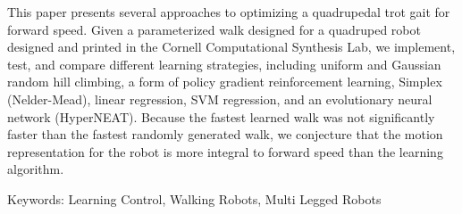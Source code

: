 This paper presents several approaches to optimizing a quadrupedal
trot gait for forward speed. Given a parameterized walk designed for
a quadruped robot designed and printed in the Cornell Computational
Synthesis Lab, we implement, test, and compare different learning strategies, 
including uniform and Gaussian random hill climbing, a form of policy 
gradient reinforcement learning\cite{1}, Simplex (Nelder-Mead), 
linear regression, SVM regression, and an evolutionary neural 
network (HyperNEAT)\cite{2}. Because the fastest learned walk was not
significantly faster than the fastest randomly generated walk, we
conjecture that the motion representation for the robot is more
integral to forward speed than the learning algorithm.


Keywords: Learning Control, Walking Robots, Multi Legged Robots

